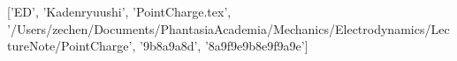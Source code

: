 ['ED', 'Kadenryuushi', 'PointCharge.tex', '/Users/zechen/Documents/PhantasiaAcademia/Mechanics/Electrodynamics/LectureNote/PointCharge', '\x9b\xaf{}\xae\xba{}\xbf{}\x8a\x9a\x8d\xbe{}', '\x8a\x9f\xba{}\x9e\x9b\xba\x8e\x9f\xba{}\x9a\xbe{}\x9e']
